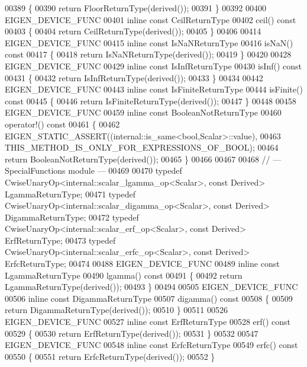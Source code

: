 \begin{DoxyCode}
00389 \textcolor{keyword}{}\{
00390   \textcolor{keywordflow}{return} FloorReturnType(derived());
00391 \}
00392 
00400 EIGEN\_DEVICE\_FUNC
00401 \textcolor{keyword}{inline} \textcolor{keyword}{const} CeilReturnType
00402 ceil()\textcolor{keyword}{ const}
00403 \textcolor{keyword}{}\{
00404   \textcolor{keywordflow}{return} CeilReturnType(derived());
00405 \}
00406 
00414 EIGEN\_DEVICE\_FUNC
00415 \textcolor{keyword}{inline} \textcolor{keyword}{const} IsNaNReturnType
00416 isNaN()\textcolor{keyword}{ const}
00417 \textcolor{keyword}{}\{
00418   \textcolor{keywordflow}{return} IsNaNReturnType(derived());
00419 \}
00420 
00428 EIGEN\_DEVICE\_FUNC
00429 \textcolor{keyword}{inline} \textcolor{keyword}{const} IsInfReturnType
00430 isInf()\textcolor{keyword}{ const}
00431 \textcolor{keyword}{}\{
00432   \textcolor{keywordflow}{return} IsInfReturnType(derived());
00433 \}
00434 
00442 EIGEN\_DEVICE\_FUNC
00443 \textcolor{keyword}{inline} \textcolor{keyword}{const} IsFiniteReturnType
00444 isFinite()\textcolor{keyword}{ const}
00445 \textcolor{keyword}{}\{
00446   \textcolor{keywordflow}{return} IsFiniteReturnType(derived());
00447 \}
00448 
00458 EIGEN\_DEVICE\_FUNC
00459 \textcolor{keyword}{inline} \textcolor{keyword}{const} BooleanNotReturnType
00460 operator!()\textcolor{keyword}{ const}
00461 \textcolor{keyword}{}\{
00462   EIGEN\_STATIC\_ASSERT((internal::is\_same<bool,Scalar>::value),
00463                       THIS\_METHOD\_IS\_ONLY\_FOR\_EXPRESSIONS\_OF\_BOOL);
00464   \textcolor{keywordflow}{return} BooleanNotReturnType(derived());
00465 \}
00466 
00467 
00468 \textcolor{comment}{// --- SpecialFunctions module ---}
00469 
00470 \textcolor{keyword}{typedef} CwiseUnaryOp<internal::scalar\_lgamma\_op<Scalar>, \textcolor{keyword}{const} Derived> LgammaReturnType;
00471 \textcolor{keyword}{typedef} CwiseUnaryOp<internal::scalar\_digamma\_op<Scalar>, \textcolor{keyword}{const} Derived> DigammaReturnType;
00472 \textcolor{keyword}{typedef} CwiseUnaryOp<internal::scalar\_erf\_op<Scalar>, \textcolor{keyword}{const} Derived> ErfReturnType;
00473 \textcolor{keyword}{typedef} CwiseUnaryOp<internal::scalar\_erfc\_op<Scalar>, \textcolor{keyword}{const} Derived> ErfcReturnType;
00474 
00488 EIGEN\_DEVICE\_FUNC
00489 \textcolor{keyword}{inline} \textcolor{keyword}{const} LgammaReturnType
00490 lgamma()\textcolor{keyword}{ const}
00491 \textcolor{keyword}{}\{
00492   \textcolor{keywordflow}{return} LgammaReturnType(derived());
00493 \}
00494 
00505 EIGEN\_DEVICE\_FUNC
00506 \textcolor{keyword}{inline} \textcolor{keyword}{const} DigammaReturnType
00507 digamma()\textcolor{keyword}{ const}
00508 \textcolor{keyword}{}\{
00509   \textcolor{keywordflow}{return} DigammaReturnType(derived());
00510 \}
00511 
00526 EIGEN\_DEVICE\_FUNC
00527 \textcolor{keyword}{inline} \textcolor{keyword}{const} ErfReturnType
00528 erf()\textcolor{keyword}{ const}
00529 \textcolor{keyword}{}\{
00530   \textcolor{keywordflow}{return} ErfReturnType(derived());
00531 \}
00532 
00547 EIGEN\_DEVICE\_FUNC
00548 \textcolor{keyword}{inline} \textcolor{keyword}{const} ErfcReturnType
00549 erfc()\textcolor{keyword}{ const}
00550 \textcolor{keyword}{}\{
00551   \textcolor{keywordflow}{return} ErfcReturnType(derived());
00552 \}
\end{DoxyCode}
